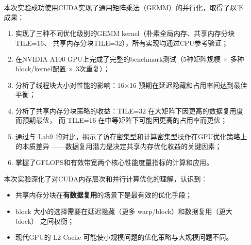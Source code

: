 \documentclass[UTF8,a4paper,12pt,fontset=none]{ctexart}
\begin{document}
本次实验成功使用CUDA实现了通用矩阵乘法（GEMM）的并行化，取得了以下成果：

\begin{enumerate}[leftmargin=2.2em]
  \item 实现了三种不同优化级别的GEMM kernel（朴素全局内存、共享内存分块TILE=16、
        共享内存分块TILE=32），所有实现均通过CPU参考验证；
  \item 在NVIDIA A100 GPU上完成了完整的benchmark测试（5种矩阵规模 × 多种block/kernel配置
        × 3次重复）；
  \item 分析了线程块大小对性能的影响：16×16 预期在延迟隐藏和占用率间达到最佳平衡；
  \item 分析了共享内存分块策略的收益：TILE=32 在大矩阵下因更高的数据复用度而预期最优，
        而 TILE=16 在中等矩阵下可能因更高的占用率而更优；
  \item 通过与 Lab9 的对比，揭示了访存密集型和计算密集型操作在GPU优化策略上的本质差异
        ——数据复用潜力是决定共享内存优化收益的关键因素；
  \item 掌握了GFLOPS和有效带宽两个核心性能度量指标的计算和应用。
\end{enumerate}

本次实验深化了对CUDA内存层次和并行计算优化的理解，认识到：
\begin{itemize}
  \item 共享内存分块在\textbf{有数据复用}的场景下是最有效的优化手段；
  \item block 大小的选择需要在延迟隐藏（更多 warp/block）和数据复用（更大 block）
        之间权衡；
  \item 现代GPU的 L2 Cache 可能使小规模问题的优化策略与大规模问题不同。
\end{itemize}
\end{document}
